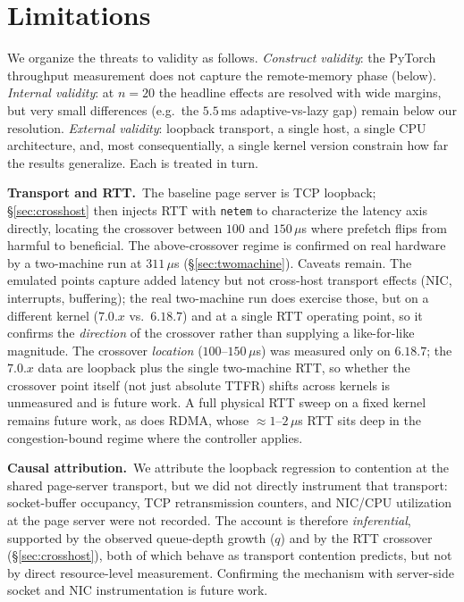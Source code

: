 \documentclass[journal]{IEEEtran}
\begin{document}
\section{Limitations}
\label{sec:limitations}

We organize the threats to validity as follows. \emph{Construct validity}:
the PyTorch throughput measurement does not capture the remote-memory phase
(below). \emph{Internal validity}: at $n\!=\!20$ the headline effects are
resolved with wide margins, but very small differences (e.g.\ the $5.5$\,ms
adaptive-vs-lazy gap) remain below our resolution. \emph{External validity}:
loopback transport, a single host, a single CPU architecture, and, most
consequentially, a single kernel version constrain how far the results
generalize. Each is treated in turn.

\textbf{Transport and RTT.}\, The baseline page server is TCP loopback;
\S\ref{sec:crosshost} then injects RTT with \texttt{netem} to characterize
the latency axis directly, locating the crossover between $100$ and
$150\,\mu$s where prefetch flips from harmful to beneficial. The above-crossover
regime is confirmed on real hardware by a two-machine run at $311\,\mu$s
(\S\ref{sec:twomachine}). Caveats remain. The emulated points capture added
latency but not cross-host transport effects (NIC, interrupts, buffering); the
real two-machine run does exercise those, but on a different kernel
($7.0.x$ vs.\ $6.18.7$) and at a single RTT operating point, so it confirms the
\emph{direction} of the crossover rather than supplying a like-for-like
magnitude. The crossover \emph{location} ($100$--$150\,\mu$s) was measured
only on $6.18.7$; the $7.0.x$ data are loopback plus the single two-machine
RTT, so whether the crossover point itself (not just absolute TTFR) shifts
across kernels is unmeasured and is future work. A full physical RTT sweep on
a fixed kernel remains future work, as does RDMA, whose
$\approx\!1$--$2\,\mu$s RTT sits deep in the congestion-bound regime where the
controller applies.

\textbf{Causal attribution.}\, We attribute the loopback regression to
contention at the shared page-server transport, but we did not directly
instrument that transport: socket-buffer occupancy, TCP retransmission
counters, and NIC/CPU utilization at the page server were not recorded. The
account is therefore \emph{inferential}, supported by the observed queue-depth
growth ($q$) and by the RTT crossover (\S\ref{sec:crosshost}), both of which
behave as transport contention predicts, but not by direct
resource-level measurement. Confirming the mechanism with server-side socket
and NIC instrumentation is future work.
\end{document}
